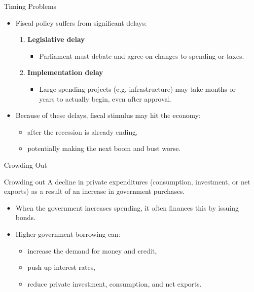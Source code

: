 \documentclass[aspectratio=169]{beamer}
\begin{document}
\begin{frame}{Timing Problems}
\transfade
\begin{itemize}[<+->]
  \item Fiscal policy suffers from significant delays:
  \begin{enumerate}[<+->]
    \item \textbf{Legislative delay}
      \begin{itemize}[<+->]
        \item Parliament must debate and agree on changes to spending or taxes.
      \end{itemize}
    \item \textbf{Implementation delay}
      \begin{itemize}[<+->]
        \item Large spending projects (e.g. infrastructure) may take months or years to actually begin, even after approval.
      \end{itemize}
  \end{enumerate}
  \item Because of these delays, fiscal stimulus may hit the economy:
  \begin{itemize}[<+->]
    \item after the recession is already ending,
    \item potentially making the next boom and bust worse.
  \end{itemize}
\end{itemize}
\end{frame}

\begin{frame}{Crowding Out}
\transfade
\begin{block}{Crowding out}
A decline in private expenditures (consumption, investment, or net exports)
as a result of an increase in government purchases.
\end{block}
\begin{itemize}[<+->]
  \item When the government increases spending, it often finances this by issuing bonds.
  \item Higher government borrowing can:
  \begin{itemize}[<+->]
    \item increase the demand for money and credit,
    \item push up interest rates,
    \item reduce private investment, consumption, and net exports.
  \end{itemize}
\end{itemize}
\end{frame}
\end{document}
